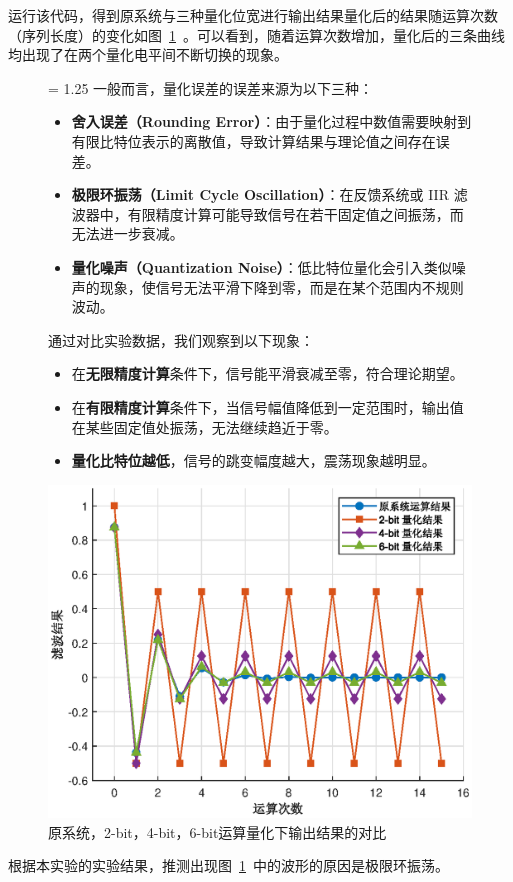 运行该代码，得到原系统与三种量化位宽进行输出结果量化后的结果随运算次数（序列长度）的变化如图~\ref{fig:2-3}~。可以看到，随着运算次数增加，量化后的三条曲线均出现了在两个量化电平间不断切换的现象。

\begin{figure}[htbp]
  \centering
  \begin{minipage}{0.5\linewidth}
    \baselineskip = 1.25 \baselineskip
    一般而言，量化误差的误差来源为以下三种：
    \begin{itemize}
        \item \textbf{舍入误差（Rounding Error）}：由于量化过程中数值需要映射到有限比特位表示的离散值，导致计算结果与理论值之间存在误差。
        \item \textbf{极限环振荡（Limit Cycle Oscillation）}：在反馈系统或 IIR 滤波器中，有限精度计算可能导致信号在若干固定值之间振荡，而无法进一步衰减。
        \item \textbf{量化噪声（Quantization Noise）}：低比特位量化会引入类似噪声的现象，使信号无法平滑下降到零，而是在某个范围内不规则波动。
    \end{itemize}

    通过对比实验数据，我们观察到以下现象：

    \begin{itemize}
        \item 在\textbf{无限精度计算}条件下，信号能平滑衰减至零，符合理论期望。
        \item 在\textbf{有限精度计算}条件下，当信号幅值降低到一定范围时，输出值在某些固定值处振荡，无法继续趋近于零。
        \item \textbf{量化比特位越低}，信号的跳变幅度越大，震荡现象越明显。
    \end{itemize}


  \end{minipage}
  \hfill
  \begin{minipage}{0.45\linewidth}
    \centering
    \includegraphics[width=0.95\linewidth]{figure/exp2/2-3.eps}
    \caption{原系统，2-bit，4-bit，6-bit运算量化下输出结果的对比}
    \label{fig:2-3}
  \end{minipage}
\end{figure}

根据本实验的实验结果，推测出现图~\ref{fig:2-3}~中的波形的原因是极限环振荡。

